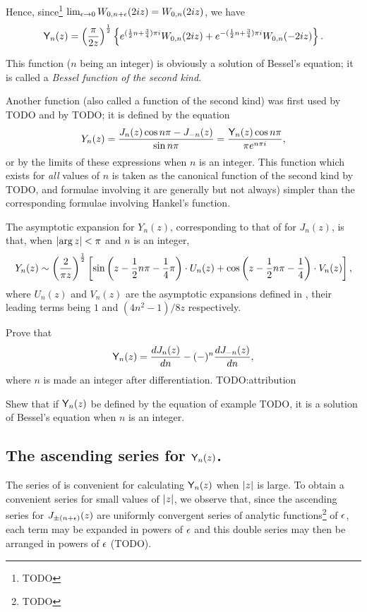 \documentclass{book}
\begin{document}
    Hence, since\footnote{TODO}
    $\lim_{\epsilon\rightarrow 0} W_{0,n+\epsilon}(2iz) = W_{0,n}(2iz)$, we
    have
    $$
    \mathsf{Y}_n(z)
    =
    \left(  \frac{\pi}{2z}  \right)^{\frac{1}{2}}
    \left\{ 
      e^{(\frac{1}{2} n + \frac{3}{4}) \pi i} W_{0,n}(2iz)
      +
      e^{-(\frac{1}{2} n + \frac{3}{4})\pi i} W_{0,n}(-2iz)
     \right\}.
    $$

    This function ($n$ being an integer) is obviously a solution of
    Bessel's equation; it is called a \emph{Bessel function of the
      second kind}.

    Another function (also called a function of the second kind) was
    first used by TODO and by TODO; it is defined by the equation
    $$
    Y_n(z) = \frac{J_n(z) \cos n\pi - J_{-n}(z)}{\sin n\pi}
    = \frac{\mathsf{Y}_n(z) \cos n\pi}{\pi e^{n\pi i}},
    $$
    or by the limits of these expressions when $n$ is an integer. This
    function which exists for \emph{all} values of $n$ is taken as the
    canonical function of the second kind by TODO, and formulae
    involving it are generally but not always) simpler than the
    corresponding formulae involving Hankel's function.

    The asymptotic expansion for $Y_n(z)$, corresponding to that of
     for $J_n(z)$, is that, when
    $\left| \arg z \right| < \pi$ and $n$ is an integer,
    $$
    Y_n(z)
    \sim
    \left(  \frac{2}{\pi z}  \right)^{\frac{1}{2}}
    \left[  \sin\left( z - \frac{1}{2} n \pi - \frac{1}{4} \pi \right)
      \cdot U_n(z)
      + \cos\left( z - \frac{1}{2} n \pi - \frac{1}{4} \right) \cdot V_n(z)
     \right],
    $$
    where $U_n(z)$ and $V_n(z)$ are the asymptotic expansions defined
    in , their leading terms being $1$ and
    $(4n^2-1)/8z$ respectively.
    \begin{wandwexample}
      Prove that
      $$
      \mathsf{Y}_n(z)
      =
      \frac{dJ_n(z)}{dn}
      -
      (-)^n \frac{dJ_{-n}(z)}{dn},
      $$
      where $n$ is made an integer after differentiation.
      TODO:attribution
    \end{wandwexample}
    \begin{wandwexample}
      Shew that if $\mathsf{Y}_n(z)$ be defined by the equation of example
      TODO, it is a solution of Bessel's equation when $n$ is an integer.
    \end{wandwexample}
    \subsection{The ascending series for $\mathsf{Y}_n(z)$.}
    The series of  is convenient for calculating
    $\mathsf{Y}_n(z)$ when $\left| z \right|$ is large. To obtain a convenient
    series for small values of $\left| z \right|$, we observe that, since
    the ascending series for $J_{\pm (n+\epsilon)}(z)$ are uniformly
    convergent series of analytic functions\footnote{TODO} of $\epsilon$,
    each term may be expanded in powers of $\epsilon$ and this double
    series may then be arranged in powers of
    $\epsilon$ (TODO).
\end{document}
